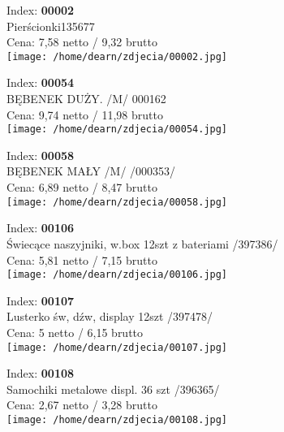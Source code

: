 
{Index: \textbf{00002}\\
Pierścionki135677\\
Cena: 7,58 netto / 9,32 brutto\\
  \texttt{[image: /home/dearn/zdjecia/00002.jpg]}}\newline\newline

{Index: \textbf{00054}\\
BĘBENEK DUŻY. /M/                               000162\\
Cena: 9,74 netto / 11,98 brutto\\
  \texttt{[image: /home/dearn/zdjecia/00054.jpg]}}\newline\newline

{Index: \textbf{00058}\\
BĘBENEK MAŁY /M/ /000353/\\
Cena: 6,89 netto / 8,47 brutto\\
  \texttt{[image: /home/dearn/zdjecia/00058.jpg]}}\newline\newline

{Index: \textbf{00106}\\
Świecące naszyjniki, w.box 12szt z bateriami /397386/\\
Cena: 5,81 netto / 7,15 brutto\\
  \texttt{[image: /home/dearn/zdjecia/00106.jpg]}}\newline\newline

{Index: \textbf{00107}\\
Lusterko św, dźw, display 12szt /397478/\\
Cena: 5 netto / 6,15 brutto\\
  \texttt{[image: /home/dearn/zdjecia/00107.jpg]}}\newline\newline

{Index: \textbf{00108}\\
Samochiki metalowe displ. 36 szt /396365/\\
Cena: 2,67 netto / 3,28 brutto\\
  \texttt{[image: /home/dearn/zdjecia/00108.jpg]}}\newline\newline

